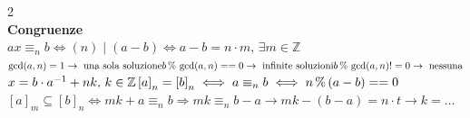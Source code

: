 \documentclass[a4paper,11pt]{article}
\begin{document}
\begin{multicols}{2}
\vspace{1em}
\textbf{\\Congruenze}\\
$ax \equiv_{n} b \iff (n)\mid(a-b) \iff a-b=n\cdot m, \, \exists m \in \mathbb{Z}$ \\
\(
\gcd(a, n)=1 \to \text{ una sola soluzione} \\
b \,\%\, \gcd(a, n)==0 \to \text{ infinite soluzioni} \\
b \,\%\, \gcd(a, n)!=0 \to \text{ nessuna} \\
\)
\(
x=b \cdot a^{-1}+nk, \, k \in \mathbb{Z} \\
\left[a\right]_n = \left[b \right]_n \iff a \equiv_{n} b \iff n \, \% \, (a-b)==0 \\
\)
\(
[a]_m \subseteq [b]_n \iff m k + a \equiv_n b \Rightarrow mk \equiv_n b-a \to mk-(b-a)=n\cdot t \to k=\dots
\)





\end{multicols}
\end{document}
